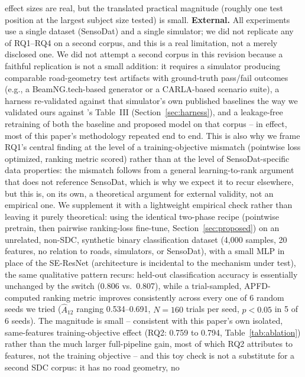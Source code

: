 \documentclass[smallextended]{svjour3}
\begin{document}
effect sizes are real, but the translated practical magnitude (roughly
one test position at the largest subject size tested) is small.
\textbf{External.} All experiments use a single
dataset (SensoDat) and a single simulator; we did not replicate any of
RQ1--RQ4 on a second corpus, and this is a real limitation, not a merely
disclosed one. We did not attempt a second corpus in this revision because
a faithful replication is not a small addition: it requires a simulator
producing comparable road-geometry test artifacts with ground-truth
pass/fail outcomes (e.g., a BeamNG.tech-based generator
\citep{papamichail2025scenario} or a CARLA-based scenario suite), a
harness re-validated against that simulator's own published baselines the
way we validated ours against \citet{aryan2026icst}'s Table~III
(Section~\ref{sec:harness}), and a leakage-free retraining of both the
baseline and proposed model on that corpus -- in effect, most of this
paper's methodology repeated end to end. This is also why we frame RQ1's
central finding at the level of a training-objective mismatch (pointwise
loss optimized, ranking metric scored) rather than at the level of
SensoDat-specific data properties: the mismatch follows from a
general learning-to-rank argument \citep{burges2005learning} that does not
reference SensoDat, which is why we expect it to recur elsewhere, but this
is, on its own, a theoretical argument for external validity, not an
empirical one. We supplement it with a lightweight empirical check rather
than leaving it purely theoretical: using the identical two-phase recipe
(pointwise pretrain, then pairwise ranking-loss fine-tune,
Section~\ref{sec:proposed}) on an unrelated, non-SDC, synthetic binary
classification dataset (4{,}000 samples, 20 features, no relation to
roads, simulators, or SensoDat), with a small MLP in place of the
SE-ResNet (architecture is incidental to the mechanism under test), the
same qualitative pattern recurs: held-out classification accuracy is
essentially unchanged by the switch (0.806 vs.\ 0.807), while a
trial-sampled, APFD-computed ranking metric improves consistently across
every one of 6 random seeds we tried ($\hat{A}_{12}$ ranging 0.534--0.691,
$N=160$ trials per seed, $p<0.05$ in 5 of 6 seeds). The magnitude is
small -- consistent with this paper's own isolated, same-features
training-objective effect (RQ2: 0.759 to 0.794, Table~\ref{tab:ablation})
rather than the much larger full-pipeline gain, most of which RQ2
attributes to features, not the training objective -- and this toy check
is not a substitute for a second SDC corpus: it has no road geometry, no
\end{document}
